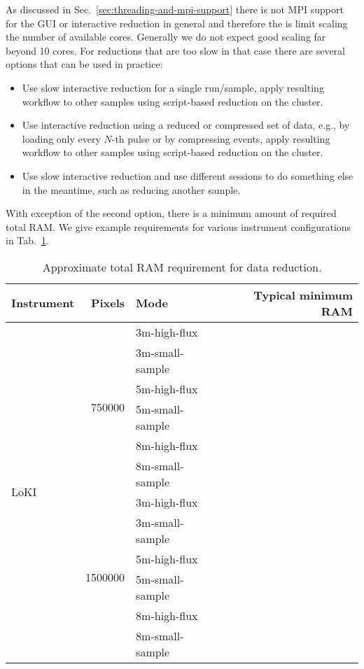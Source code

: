 \documentclass[a4paper,english,numbers=noenddot,bibliography=totoc,chapterprefix=on,DIV=12]{scrartcl}
\newcommand{\loki}{LoKI\xspace}
\begin{document}
As discussed in Sec.~\ref{sec:threading-and-mpi-support} there is not MPI support for the GUI or interactive reduction in general and therefore the is limit scaling the number of available cores.
Generally we do not expect good scaling far beyond 10 cores.
For reductions that are too slow in that case there are several options that can be used in practice:
\begin{itemize}
  \item Use slow interactive reduction for a single run/sample, apply resulting workflow to other samples using script-based reduction on the cluster.
  \item Use interactive reduction using a reduced or compressed set of data, e.g., by loading only every $N$-th pulse or by compressing events, apply resulting workflow to other samples using script-based reduction on the cluster.
  \item Use slow interactive reduction and use different sessions to do something else in the meantime, such as reducing another sample.
\end{itemize}
With exception of the second option, there is a minimum amount of required total RAM.
We give example requirements for various instrument configurations in Tab.~\ref{tab:total-ram}.

\begin{table}
  \centering
  \begin{tabular}{lrlr}
    Instrument & Pixels & Mode & Typical minimum RAM\\
    \hline
    \multirow{12}{*}{\loki}
    & \multirow{6}{*}{750000}
    & 3m-high-flux    & \\
    && 3m-small-sample & \\
    && 5m-high-flux    & \\
    && 5m-small-sample & \\
    && 8m-high-flux    & \\
    && 8m-small-sample & \\\cline{2-4}
    & \multirow{6}{*}{1500000}
    & 3m-high-flux    & \\
    && 3m-small-sample & \\
    && 5m-high-flux    & \\
    && 5m-small-sample & \\
    && 8m-high-flux    & \\
    && 8m-small-sample & \\
    \hline
  \end{tabular}
  \caption{\label{tab:total-ram}
Approximate total RAM requirement for data reduction.
}
\end{table}
\end{document}
